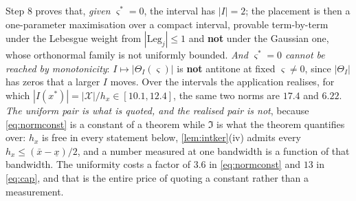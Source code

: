 Step 8 proves that, \emph{given} $\varsigma^\ast=0$, the interval has $|I|=2$; the placement is then a
one-parameter maximisation over a compact interval, provable term-by-term under the Lebesgue weight from
$|\mathrm{Leg}_j|\le1$ and \textbf{not} under the Gaussian one, whose orthonormal family is not
uniformly bounded. \emph{And $\varsigma^\ast=0$ cannot be reached by monotonicity}: $I\mapsto
|\Theta_I(\varsigma)|$ is \textbf{not} antitone at fixed $\varsigma\ne0$, since $|\Theta_I|$ has zeros
that a larger $I$ moves. Over the intervals the application realises, for which
$|I(x^\ast)|=|\mathcal X|/h_x\in[10.1,12.4]$, the same two norms are $17.4$ and $6.22$. \emph{The
uniform pair is what is quoted, and the realised pair is not}, because \eqref{eq:normconst} is a
constant of a theorem while $\mathfrak I$ is what the theorem quantifies over: $h_x$ is free in every
statement below, \cref{lem:intker}\textup{(iv)} admits every $h_x\le(\bar x-\underline x)/2$, and a
number measured at one bandwidth is a function of that bandwidth. The uniformity costs a factor of
$3.6$ in \eqref{eq:normconst} and $13$ in \eqref{eq:cap}, and that is the entire price of quoting a
constant rather than a measurement.

